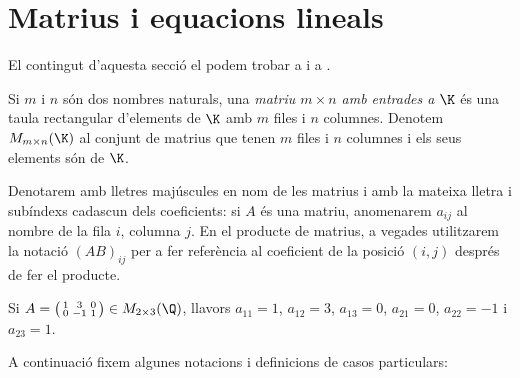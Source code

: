 \section{Matrius i equacions lineals}
El contingut d'aquesta secció el podem trobar a \cite[Tema 1]{Bret} i a \cite[Tema 2]{NaXa}.
\begin{definicio}
	Si $m$ i $n$ són dos nombres naturals, una \emph{matriu $m\times n$ amb entrades a $\K$} és una taula rectangular d'elements de $\K$ amb $m$ files i $n$ columnes. Denotem $M_{m\times n}(\K)$ al conjunt de matrius que tenen $m$ files i $n$ columnes i els seus elements són de $\K$.
\end{definicio}
\begin{notacio}
	Denotarem amb lletres majúscules en nom de les matrius i amb la mateixa lletra i subíndexs cadascun dels coeficients: si $A$ és una matriu, anomenarem $a_{ij}$ al nombre de la fila $i$, columna $j$. En el producte de matrius, a vegades utilitzarem la notació $(AB)_{ij}$ per a fer referència al coeficient de la posició $(i,j)$ després de fer el producte.
\end{notacio}
\begin{exemple}
	Si $A=\big(\begin{smallmatrix}
	1 & 3 & 0 \\ 0 & -1 & 1
	\end{smallmatrix}\big) \in M_{2\times3}(\Q)$, llavors $a_{11}=1$, $a_{12}=3$, $a_{13}=0$, $a_{21}=0$, $a_{22}=-1$ i $a_{23}=1$.
\end{exemple}
A continuació fixem algunes notacions i definicions de casos particulars:
